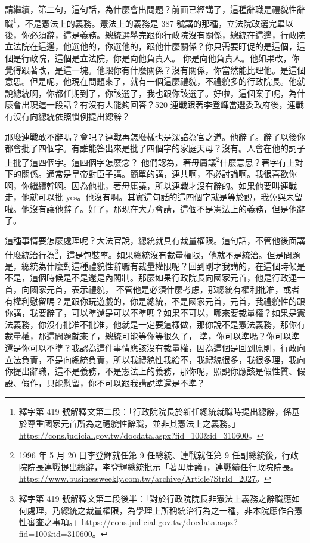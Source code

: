 \hypertarget{c08:cue:98}{}請繼續，第二句，這句話，為什麼會出問題？前面已經講了，這種辭職是禮貌性辭職\footnote{釋字第 419 號解釋文第二段：「行政院院長於新任總統就職時提出總辭，係基於尊重國家元首所為之禮貌性辭職，並非其憲法上之義務。」\url{https://cons.judicial.gov.tw/docdata.aspx?fid=100&id=310600}。}，不是憲法上的義務。憲法上的義務是 387 號講的那種，立法院改選完畢以後，你必須辭，這是義務。總統選舉完跟你行政院沒有關係，總統在這邊，行政院立法院在這邊，他選他的，你選他的，跟他什麼關係？你只需要盯促的是這個，這個是行政院，這個是立法院，你是向他負責人。
\hypertarget{c08:cue:99}{}你是向他負責人。他如果改，你覺得跟著改，是這一塊。他跟你有什麼關係？沒有關係，你當然能比理他。是這個意思。但是呢，他現在問題來了，就有一個這麼禮貌，不禮貌多的行政院長。他就說總統啊，你都任期到了，你該選了，我也跟你該選了。好啦，這個案子呢，為什麼會出現這一段話？有沒有人能夠回答？520 連戰跟著李登輝當選委政府後，連戰有沒有向總統依照慣例提出總辭？

\hypertarget{c08:cue:100}{}那麼連戰敢不辭嗎？會吧？連戰再怎麼樣也是深諳為官之道。他辭了。辭了以後你都會批了四個字。有誰能答出來是批了四個字的家庭天母？沒有。人會在他的詞子上批了這四個字。這四個字怎麼念？
\hypertarget{c08:cue:101}{}他們認為，著毋庸議\footnote{1996 年 5 月 20 日李登輝就任第 9 任總統、連戰就任第 9 任副總統後，行政院院長連戰提出總辭，李登輝總統批示「著毋庸議」，連戰續任行政院院長。\url{https://www.businessweekly.com.tw/archive/Article?StrId=2027}。}什麼意思？著字有上對下的關係。通常是皇帝對臣子講。簡單的講，連共啊，不必討論啊。我很喜歡你啊，你繼續幹啊。因為他批，著毋庸議，所以連戰才沒有辭的。如果他要叫連戰走，他就可以批 yes。他沒有啊。其實這句話的這四個字就是等於說，我免與未留啦。他沒有讓他辭了。好了，那現在大方會講，這個不是憲法上的義務，但是他辭了。

\hypertarget{c08:cue:102}{}這種事情要怎麼處理呢？大法官說，總統就具有裁量權限。這句話，不管他後面講什麼統治行為\footnote{釋字第 419 號解釋文第二段後半：「對於行政院院長非憲法上義務之辭職應如何處理，乃總統之裁量權限，為學理上所稱統治行為之一種，非本院應作合憲性審查之事項。」\url{https://cons.judicial.gov.tw/docdata.aspx?fid=100&id=310600}。}，這是包裝率。如果總統沒有裁量權限，他就不是統治。但是問題是，總統為什麼對這種禮貌性辭職有裁量權限呢？回到剛才我講的，在這個時候是不是，這個時候是不是還是內閣制。那麼如果行政院長向國家元首，他是行政連一首，向國家元首，表示禮貌，
\hypertarget{c08:cue:103}{}不管他是必須什麼考慮，那總統有權利批准，或者有權利慰留嗎？是跟你玩遊戲的，你是總統，不是國家元首，元首，我禮貌性的跟你講，我要辭了，可以準還是可以不準嗎？如果不可以，哪來要裁量權？如果是憲法義務，你沒有批准不批准，他就是一定要這樣做，那你說不是憲法義務，那你有裁量權，那這問題就來了，總統可能等你等很久了，
\hypertarget{c08:cue:104}{}準，你可以準嗎？你可以準還是你可以不準？我認為這件事情應該沒有裁量權，因為這個是回到原則，行政向立法負責，不是向總統負責，所以我禮貌性我給不，我禮貌很多，我很多理，我向你提出辭職，這不是義務，不是憲法上的義務，那你呢，照說你應該是假性質、假設、假作，只能慰留，你不可以跟我講說準還是不準？

